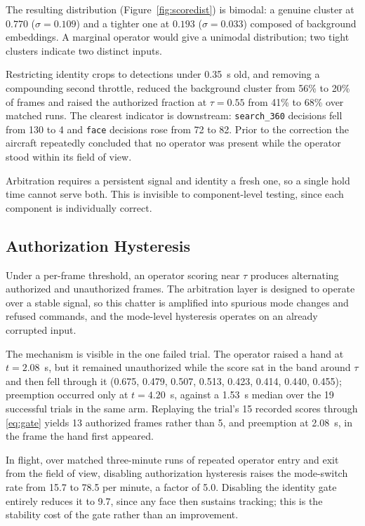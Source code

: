 \documentclass[conference]{IEEEtran}
\begin{document}
The resulting distribution (Figure~\ref{fig:scoredist}) is bimodal: a genuine
cluster at $0.770$ ($\sigma=0.109$) and a tighter one at $0.193$
($\sigma=0.033$) composed of background embeddings. A marginal operator would
give a unimodal distribution; two tight clusters indicate two distinct inputs.

Restricting identity crops to detections under 0.35~s old, and removing a
compounding second throttle, reduced the background cluster from 56\% to 20\% of
frames and raised the authorized fraction at $\tau=0.55$ from 41\% to 68\% over
matched runs. The clearest indicator is downstream: \texttt{search\_360}
decisions fell from 130 to 4 and \texttt{face} decisions rose from 72 to 82.
Prior to the correction the aircraft repeatedly concluded that no operator was
present while the operator stood within its field of view.

Arbitration requires a persistent signal and identity a fresh one, so a single
hold time cannot serve both. This is invisible to component-level testing,
since each component is individually correct.

\subsection{Authorization Hysteresis}
\label{sec:hysteresis}


Under a per-frame threshold, an operator scoring near $\tau$ produces alternating
authorized and unauthorized frames. The arbitration layer is designed to operate
over a stable signal, so this chatter is amplified into spurious mode changes and
refused commands, and the mode-level hysteresis operates on an already corrupted
input.

The mechanism is visible in the one failed trial. The operator raised a hand at
$t=2.08$~s, but it remained unauthorized while the score sat in the band around
$\tau$ and then fell through it (0.675, 0.479, 0.507, 0.513, 0.423, 0.414,
0.440, 0.455); preemption occurred only at $t=4.20$~s, against a 1.53~s median
over the 19 successful trials in the same arm. Replaying the trial's 15 recorded
scores through \eqref{eq:gate} yields 13 authorized frames rather than 5, and
preemption at 2.08~s, in the frame the hand first appeared.

In flight, over matched three-minute runs of repeated operator entry and exit
from the field of view, disabling authorization hysteresis raises the mode-switch
rate from 15.7 to 78.5 per minute, a factor of 5.0. Disabling the identity gate
entirely reduces it to 9.7, since any face then sustains tracking; this is the
stability cost of the gate rather than an improvement.
\end{document}
